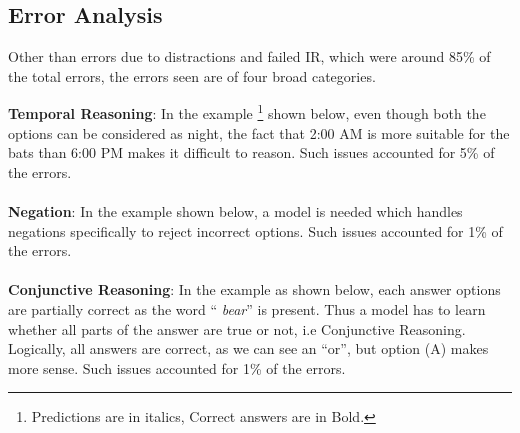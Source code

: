 \documentclass[11pt,a4paper]{article}
\begin{document}
\subsection{Error Analysis}
Other than errors due to distractions and failed IR, which were around 85\% of the total errors, the errors seen are of four broad categories. 

\textbf{Temporal Reasoning}: In the example \footnote{Predictions are in italics, Correct answers are in Bold.} shown below, even though both the options can be considered as night, the fact that 2:00 AM is more suitable for the bats than 6:00 PM makes it difficult to reason. Such issues accounted for 5\% of the errors. \\


    \noindent
     \\





\textbf{Negation}: In the example shown below, a model is needed which handles negations specifically to reject incorrect options.  Such issues accounted for 1\% of the errors. \\
    
\noindent
    \\




    




\textbf{Conjunctive Reasoning}: In the example as shown below, each answer options are partially correct as the word ``\textit{ bear}'' is present. Thus a model has to learn whether all parts of the answer are true or not, i.e Conjunctive Reasoning. Logically, all answers are correct, as we can see an ``or'',  but option (A) makes more sense.  Such issues accounted for 1\% of the errors. \\
\end{document}
